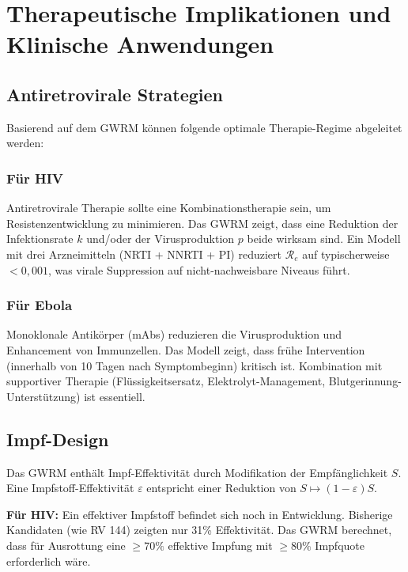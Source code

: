 ﻿\documentclass[a4paper,12pt]{article}
\theoremstyle{definition}
\begin{document}
\section{Therapeutische Implikationen und Klinische Anwendungen}

\subsection{Antiretrovirale Strategien}

Basierend auf dem GWRM können folgende optimale Therapie-Regime abgeleitet werden:

\subsubsection{Für HIV}
Antiretrovirale Therapie sollte eine Kombinationstherapie sein, um Resistenzentwicklung zu minimieren. Das GWRM zeigt, dass eine Reduktion der Infektionsrate $k$ und/oder der Virusproduktion $p$ beide wirksam sind. Ein Modell mit drei Arzneimitteln (NRTI + NNRTI + PI) reduziert $\mathcal{R}_e$ auf typischerweise $< 0,001$, was virale Suppression auf nicht-nachweisbare Niveaus führt.

\subsubsection{Für Ebola}
Monoklonale Antikörper (mAbs) reduzieren die Virusproduktion und Enhancement von Immunzellen. Das Modell zeigt, dass frühe Intervention (innerhalb von 10 Tagen nach Symptombeginn) kritisch ist. Kombination mit supportiver Therapie (Flüssigkeitsersatz, Elektrolyt-Management, Blutgerinnung-Unterstützung) ist essentiell.

\subsection{Impf-Design}

Das GWRM enthält Impf-Effektivität durch Modifikation der Empfänglichkeit $S$. Eine Impfstoff-Effektivität $\varepsilon$ entspricht einer Reduktion von $S \mapsto (1-\varepsilon) S$.

\textbf{Für HIV:} Ein effektiver Impfstoff befindet sich noch in Entwicklung. Bisherige Kandidaten (wie RV 144) zeigten nur 31\% Effektivität. Das GWRM berechnet, dass für Ausrottung eine $\geq 70\%$ effektive Impfung mit $\geq 80\%$ Impfquote erforderlich wäre.
\end{document}
